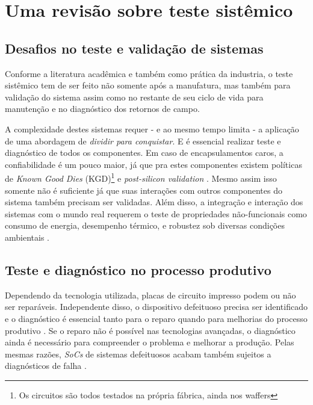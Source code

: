 \chapter{Uma revisão sobre teste sistêmico}

\section{Desafios no teste e validação de sistemas}

Conforme a literatura acadêmica \citep{jutman2014high} e também como prática da industria, o teste sistêmico tem de ser feito não somente após a manufatura, mas também para validação do sistema assim como no restante de seu ciclo de vida para manutenção e no diagnóstico dos retornos de campo. 

A complexidade destes sistemas requer - e ao mesmo tempo limita - a aplicação de uma abordagem de \textit{dividir para conquistar}. E é essencial realizar teste e diagnóstico de todos os componentes. Em caso  de encapsulamentos caros, a confiabilidade é um pouco maior, já que pra estes componentes existem políticas de \textit{Known Good Dies} (KGD)\footnote{Os circuitos são todos testados na própria fábrica, ainda nos waffers} e \textit{post-silicon validation} \citep{gilg1997known}. Mesmo assim isso somente não é suficiente já que suas interações com outros componentes do sistema também precisam ser validadas. Além disso, a integração e interação dos sistemas com o mundo real requerem o teste de propriedades não-funcionais como consumo de energia, desempenho térmico, e robustez sob diversas condições ambientais \citep{mitra2010post,ko2008distributed, jutman2014high}.

\section{Teste e diagnóstico no processo produtivo}

Dependendo da tecnologia utilizada, placas de circuito impresso podem ou não ser reparáveis. Independente disso, o dispositivo defeituoso precisa ser identificado e o diagnóstico é essencial tanto para o reparo quando para melhorias do processo produtivo \citep{ye2013board}. Se o reparo não é possível nas tecnologias avançadas, o diagnóstico ainda é necessário para compreender o problema e melhorar a produção. Pelas mesmas razões, \textit{SoCs} de sistemas defeituosos acabam também sujeitos a diagnósticos de falha \citep{tang2007analyzing, jutman2014high}.

